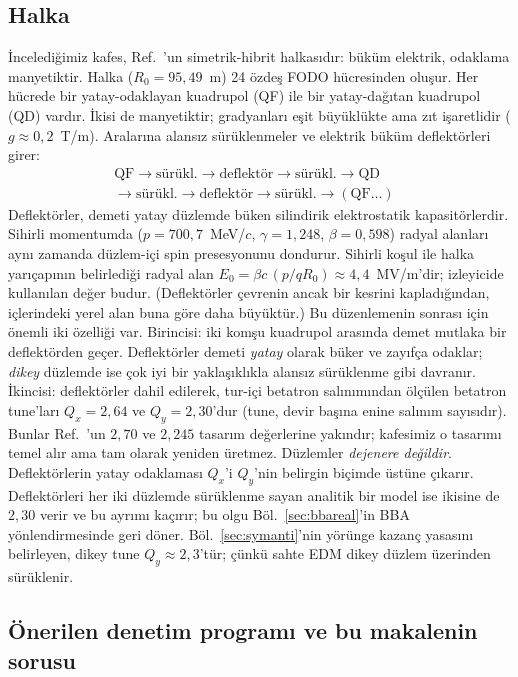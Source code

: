 \documentclass[aps,prab,reprint,superscriptaddress,nofootinbib]{revtex4-2}
\begin{document}
\subsection{Halka}
\label{sec:ring}

İncelediğimiz kafes, Ref.~\cite{omarov}'un simetrik-hibrit halkasıdır: büküm
elektrik, odaklama manyetiktir. Halka ($R_0 = 95{,}49$~m) 24 özdeş FODO
hücresinden oluşur. Her hücrede bir yatay-odaklayan kuadrupol (QF) ile bir
yatay-dağıtan kuadrupol (QD) vardır. İkisi de manyetiktir; gradyanları eşit
büyüklükte ama zıt işaretlidir ($g \approx 0{,}2$~T/m). Aralarına alansız
sürüklenmeler ve elektrik büküm deflektörleri girer:
\begin{align*}
  \text{QF} \to \text{sürükl.} \to \text{deflektör} \to \text{sürükl.} \to
  \text{QD} & \\
  {} \to \text{sürükl.} \to \text{deflektör} \to \text{sürükl.} \to
  (\text{QF}\ldots) &
\end{align*}
Deflektörler, demeti yatay düzlemde büken silindirik elektrostatik kapasitörlerdir.
Sihirli momentumda ($p = 700{,}7$~MeV/$c$, $\gamma = 1{,}248$, $\beta = 0{,}598$)
radyal alanları aynı zamanda düzlem-içi spin presesyonunu dondurur. Sihirli koşul
ile halka yarıçapının belirlediği radyal alan $E_0 = \beta c\, (p/qR_0) \approx
4{,}4$~MV/m'dir; izleyicide kullanılan değer budur. (Deflektörler çevrenin ancak
bir kesrini kapladığından, içlerindeki yerel alan buna göre daha büyüktür.) Bu
düzenlemenin sonrası için önemli iki özelliği var. Birincisi: iki komşu kuadrupol
arasında demet mutlaka bir deflektörden geçer. Deflektörler demeti \emph{yatay}
olarak büker ve zayıfça odaklar; \emph{dikey} düzlemde ise çok iyi bir
yaklaşıklıkla alansız sürüklenme gibi davranır. İkincisi: deflektörler dahil
edilerek, tur-içi betatron salınımından ölçülen betatron tune'ları $Q_x = 2{,}64$
ve $Q_y = 2{,}30$'dur (tune, devir başına enine salınım sayısıdır). Bunlar
Ref.~\cite{omarov}'un $2{,}70$ ve $2{,}245$ tasarım değerlerine yakındır; kafesimiz
o tasarımı temel alır ama tam olarak yeniden üretmez. Düzlemler \emph{dejenere
değildir}. Deflektörlerin yatay odaklaması $Q_x$'i $Q_y$'nin belirgin biçimde
üstüne çıkarır. Deflektörleri her iki düzlemde sürüklenme sayan analitik bir model
ise ikisine de $2{,}30$ verir ve bu ayrımı kaçırır; bu olgu
Böl.~\ref{sec:bbareal}'in BBA yönlendirmesinde geri döner. Böl.~\ref{sec:symanti}'nin
yörünge kazanç yasasını belirleyen, dikey tune $Q_y \approx 2{,}3$'tür; çünkü sahte
EDM dikey düzlem üzerinden sürüklenir.

\subsection{Önerilen denetim programı ve bu makalenin sorusu}
\label{sec:remedy}
\end{document}
